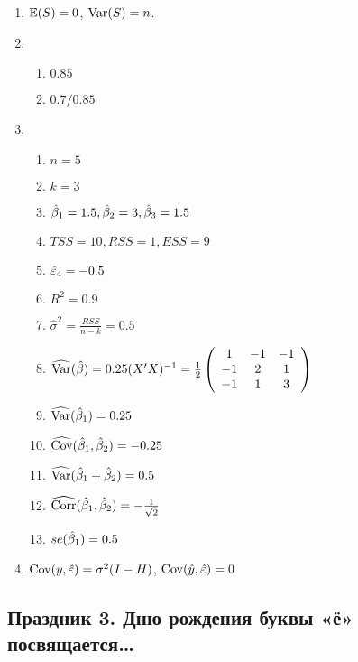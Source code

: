 \documentclass[12pt, a4paper]{article}
\theoremstyle{definition}
\begin{document}
\begin{enumerate}
\item $\operatorname{\mathbb{E}}(S) = 0$, $\operatorname{Var}(S) = n$.
\item
\begin{enumerate}
\item $0.85$
\item $0.7 / 0.85$
\end{enumerate}
\item
\begin{enumerate}
\item $n = 5$
\item $k = 3$
\item $\hat{\beta}_1 = 1.5, \hat{\beta}_2 = 3, \hat{\beta}_3 = 1.5$
\item $TSS = 10, RSS = 1, ESS = 9$
\item $\hat{\varepsilon}_4 = -0.5$
\item $R^2 = 0.9$
\item $\hat{\sigma}^2 = \frac{RSS}{n-k} = 0.5$
\item $\widehat{\operatorname{Var}}(\hat{\beta}) = 0.25 (X'X)^{-1}=\frac{1}{2}\left(
\begin{array}{ccc}
1 & -1 & -1 \\
-1 & 2 & 1 \\
-1 & 1 & 3
\end{array}\right)$
\item $\widehat{\operatorname{Var}}(\hat{\beta}_1) = 0.25$
\item $\widehat{\operatorname{Cov}}(\hat{\beta}_1,\hat{\beta}_2) = -0.25$
\item $\widehat{\operatorname{Var}}(\hat{\beta}_1+\hat{\beta}_2) = 0.5$
\item $\operatorname{\widehat{\operatorname{Corr}}}(\hat{\beta}_1,\hat{\beta}_2) = -\frac{1}{\sqrt{2}}$
\item $se(\hat{\beta}_1) = 0.5$
\end{enumerate}
\item $\operatorname{Cov}(y,\hat{\varepsilon}) = \sigma^2 (I-H)$, $\operatorname{Cov}(\hat{y},\hat{\varepsilon}) = 0$
\end{enumerate}


\subsection{Праздник 3. Дню рождения буквы «ё» посвящается\ldots}
\end{document}
